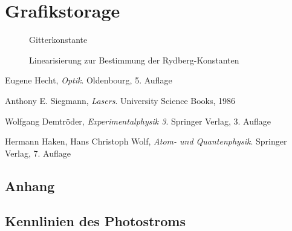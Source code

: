 \documentclass[11pt, a4paper]{article}
\numberwithin{equation}{section}
\begin{document}
\section{Grafikstorage}

\begin{figure}
\centering

\caption{Gitterkonstante}
\label{fig:gitterkonstante}
\end{figure}

\clearpage

\begin{figure}
	\centering
	
	\caption{Linearisierung zur Bestimmung der Rydberg-Konstanten}
	\label{fig:rydberg_balmer}
\end{figure}



\begin{thebibliography}{9}

	Eugene Hecht,
	\emph{Optik}.
	Oldenbourg,
	5. Auflage
	
	Anthony E. Siegmann,
	\emph{Lasers}.
	University Science Books,
	1986
	
	Wolfgang Demtröder,
	\emph{Experimentalphysik 3}.
	Springer Verlag,
	3. Auflage
 
	Hermann Haken, Hans Christoph Wolf,
	\emph{Atom- und Quantenphysik}.
	Springer Verlag,
	7. Auflage
 
\end{thebibliography}

\begin{appendix}
\section{Anhang}
\subsection{Kennlinien des Photostroms}
\label{app:kennlinien}
\FloatBarrier


\end{appendix}
\end{document}
